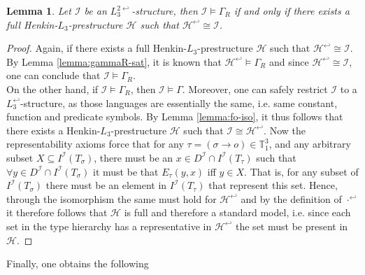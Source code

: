 \documentclass[11pt,a4paper]{article}
\newtheorem{lemma}[theorem]{Lemma}
\newcommand{\tofo}{\hookleftarrow}
\newcommand{\of}{\iota }
\begin{document}
\begin{lemma}
\label{lemma:full-iso}
Let $\mathcal{I}$ be an $L_3^{2\tofo}$-structure, then $\mathcal{I}\models \Gamma_R$ if and only if there exists a full Henkin-$L_3$-prestructure $\mathcal{H}$ such that $\mathcal{H}^{\tofo}\cong\mathcal{I}$.
\end{lemma}
\begin{proof}
Again, if there exists a full Henkin-$L_3$-prestructure $\mathcal{H}$ such that $\mathcal{H}^{\tofo}\cong\mathcal{I}$. By Lemma \ref{lemma:gammaR-sat}, it is known that $\mathcal{H}^{\tofo} \models \Gamma_R$ and since $\mathcal{H}^{\tofo}\cong\mathcal{I}$, one can conclude that $\mathcal{I}\models \Gamma_R$. \\

On the other hand, if $\mathcal{I}\models \Gamma_R$, then $\mathcal{I}\models \Gamma$. Moreover, one can safely restrict $\mathcal{I}$
to a $L_3^{\tofo}$-structure, as those languages are essentially the same, i.e. same constant, function and predicate symbols. By Lemma \ref{lemma:fo-iso}, it thus follows that there exists a Henkin-$L_3$-prestructure $\mathcal{H}$ such that $\mathcal{I} \cong \mathcal{H}^{\tofo}$. Now the representability axioms force that for any $\tau=(\sigma \to o) \in \mathbb{T}_1^3$, and any arbitrary subset $X \subseteq I^{\mathcal{I}}(T_{\sigma})$, there must be an $x \in D^{\mathcal{I}} \cap I^{\mathcal{I}}(T_{\tau})$ such that $\forall y \in D^{\mathcal{I}} \cap I^{\mathcal{I}}(T_{\sigma})$  it must be that $E_{\tau}(y,x)$ iff $y \in X$. That is, for any subset of $I^{\mathcal{I}}(T_{\sigma})$ there must be an element in $I^{\mathcal{I}}(T_{\tau})$ that represent this set. 
Hence, through the isomorphism the same must hold for $\mathcal{H}^{\tofo}$ and by the definition of $\cdot^{\tofo}$ it therefore follows that $\mathcal{H}$ is full and therefore a standard model, i.e. since each set in the type hierarchy has a representative in $\mathcal{H}^{\tofo}$ the set must be present in $\mathcal{H}$. 
\end{proof}
Finally, one obtains the following
\end{document}
